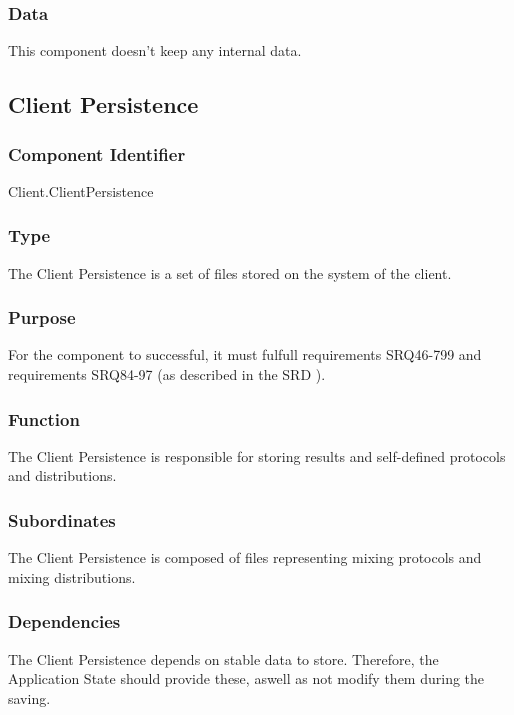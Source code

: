 \subsubsection*{Data}
This component doesn't keep any internal data.

\subsection{Client Persistence}

\subsubsection*{Component Identifier}
Client.ClientPersistence

\subsubsection*{Type}
The Client Persistence is a set of files stored on the system of the client.

\subsubsection*{Purpose}
For the component to successful, it must fulfull requirements SRQ46-799 and requirements SRQ84-97 (as described in the SRD \cite{srd}).

\subsubsection*{Function}
The Client Persistence is responsible for storing results and self-defined protocols and distributions.

\subsubsection*{Subordinates}
The Client Persistence is composed of files representing mixing protocols and mixing distributions.

\subsubsection*{Dependencies}
The Client Persistence depends on stable data to store. Therefore, the Application State should provide these, aswell as not modify them during the saving.

